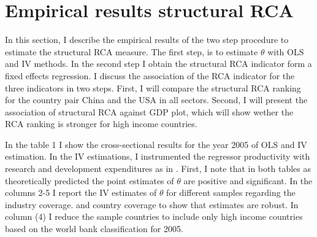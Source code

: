 \section{Empirical results structural RCA}
\label{sec:cross-section}
In this section, I describe the empirical results of the two step procedure to estimate the structural RCA measure.  The first step, is to estimate $\theta$ with OLS and IV methods. %
In the second step I obtain the structural RCA indicator form a fixed effects regression. I discuss the association of the RCA indicator for the three indicators in two steps. First, I will compare the structural RCA ranking for the country pair China and the USA in all sectors. Second, I will present the association of structural RCA against GDP plot, which will show wether the RCA ranking is stronger for high income countries.
\par 
In the table  1 I show the cross-sectional results for the year 2005 of OLS and IV estimation. In the IV estimations, I instrumented the regressor productivity with research and development expenditures as in  \textcite{costinot}. First, I note that in both tables as theoretically predicted the point estimates of $\theta$ are positive and significant.  In the columns 2-5 I report the IV estimates of $\theta$  for different samples regarding  the industry coverage. and country coverage to show that estimates are robust. In column (4) I reduce the sample countries to include only high income countries based on the world bank classification for 2005. 
